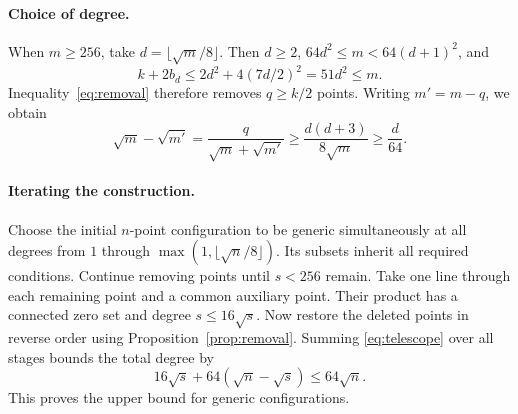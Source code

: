 \documentclass[11pt,letterpaper]{article}
\begin{document}
\paragraph{Choice of degree.}
When $m\geq256$, take $d=\lfloor\sqrt m/8\rfloor$. Then $d\geq2$, $64d^2\leq m<64(d+1)^2$, and
\[
k+2b_d\leq2d^2+4(7d/2)^2=51d^2\leq m.
\]
Inequality~\eqref{eq:removal} therefore removes $q\geq k/2$ points. Writing $m'=m-q$, we obtain
\begin{equation}\label{eq:telescope}
\sqrt m-\sqrt{m'}=\frac q{\sqrt m+\sqrt{m'}}
\geq\frac{d(d+3)}{8\sqrt m}\geq\frac d{64}.
\end{equation}

\paragraph{Iterating the construction.}
Choose the initial $n$-point configuration to be generic simultaneously at all degrees from $1$ through $\max(1,\lfloor\sqrt n/8\rfloor)$. Its subsets inherit all required conditions. Continue removing points until $s<256$ remain. Take one line through each remaining point and a common auxiliary point. Their product has a connected zero set and degree $s\leq16\sqrt s$. Now restore the deleted points in reverse order using Proposition~\ref{prop:removal}. Summing \eqref{eq:telescope} over all stages bounds the total degree by
\[
16\sqrt s+64(\sqrt n-\sqrt s)\leq64\sqrt n.
\]
This proves the upper bound for generic configurations.
\end{document}
